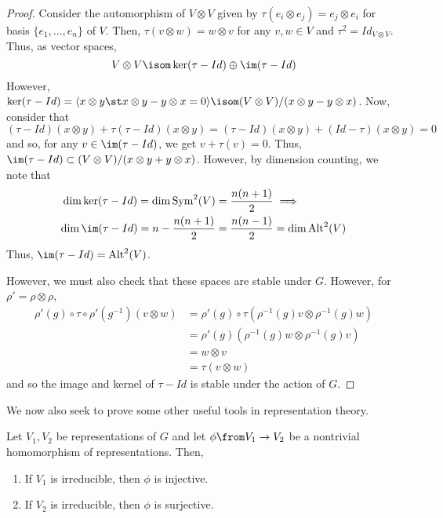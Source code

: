\documentclass[11pt,leqno,oneside]{amsbook}
\numberwithin{thm}{section}
\begin{document}
\begin{proof}
  Consider the automorphism of \(V \otimes V\) given by \(\tau(e_i
  \otimes e_j) = e_j \otimes e_i\) for basis \(\{e_1, \ldots, e_n\}\)
  of \(V\). Then, \(\tau(v \otimes w) = w \otimes v\) for any \(v,w
  \in V\) and \(\tau^2 = Id_{V \otimes V}\). Thus, as vector spaces, \[
    V \otimes V \isom  \ker (\tau-Id) \oplus \im (\tau-Id) 
  \]
  However, \(\ker(\tau-Id) = \langle x \otimes y \st x \otimes y - y
  \otimes x = 0 \rangle \isom (V \otimes V)/(x \otimes y - y \otimes
  x)\). Now, consider that \[
    (\tau-Id)(x \otimes y) + \tau(\tau-Id)(x \otimes y) = (\tau-Id)(x
    \otimes y) + (Id - \tau)(x \otimes y) = 0
  \]
  and so, for any \(v \in \im(\tau-Id)\), we get \(v + \tau(v) =
  0\). Thus, \(\im(\tau-Id) \subset (V \otimes V)/(x \otimes y + y
  \otimes x)\). However, by dimension counting, we note that
  \begin{align*}
        \dim \ker(\tau-Id) = \dim \operatorname{Sym}^2(V) &= \frac{n(n+1)}{2} \implies \\ \dim
    \im(\tau-Id) = n - \frac{n(n+1)}{2} &= \frac{n(n-1)}{2} = \dim \operatorname{Alt}^2(V)
  \end{align*}
  Thus, \(\im(\tau-Id) = \operatorname{Alt}^2(V)\).

  However, we must also check that these spaces are stable under
  \(G\). However, for \(\rho' = \rho \otimes \rho\),
  \begin{align*}
    \rho'(g) \circ \tau \circ \rho'(g^{-1}) (v \otimes w)
    & = \rho'(g)
      \circ \tau (\rho^{-1}(g)v \otimes \rho^{-1}(g)w) \\
    & = \rho'(g)(\rho^{-1}(g)w \otimes \rho^{-1}(g)v) \\
    & = w \otimes v \\
    & = \tau(v \otimes w)
  \end{align*}
  and so the image and kernel of \(\tau-Id\) is stable under the
  action of \(G\).
\end{proof}
We now also seek to prove some other useful tools in representation
theory.
\begin{thm}
  Let \(V_1, V_2\) be representations of \(G\) and let \(\phi \from
  V_1 \to V_2\) be a nontrivial homomorphism of representations. Then,
  \begin{enumerate}
  \item If \(V_1\) is irreducible, then \(\phi\) is injective.
  \item If \(V_2\) is irreducible, then \(\phi\) is surjective.
  \end{enumerate}
\end{thm}
\end{document}
